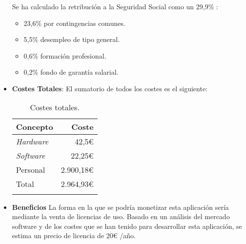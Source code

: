 \begin{itemize}
Se ha calculado la retribución a la Seguridad Social como un 29,9\% : 
\begin{itemize}
	\item 23,6\% por contingencias comunes.
	\item 5,5\% desempleo de tipo general.
	\item 0,6\% formación profesional.
	\item 0,2\% fondo de garantía salarial.
\end{itemize}
\item \textbf{Costes Totales}:
El sumatorio de todos los costes es el siguiente:

\begin{longtable}[]{@{}lr@{}}
\toprule
\begin{minipage}[b]{0.22\columnwidth}\raggedright\strut
\textbf{Concepto}\strut
\end{minipage} & \begin{minipage}[b]{0.22\columnwidth}\raggedright\strut
\textbf{Coste}\strut
\end{minipage}\tabularnewline
\midrule
\endhead
\begin{minipage}[t]{0.22\columnwidth}\raggedright\strut
\emph{Hardware}\strut
\end{minipage} & \begin{minipage}[t]{0.22\columnwidth}\raggedright\strut
42,5\euro{}\strut
\end{minipage}\tabularnewline
\begin{minipage}[t]{0.22\columnwidth}\raggedright\strut
\emph{Software}\strut
\end{minipage} & \begin{minipage}[t]{0.22\columnwidth}\raggedright\strut
22,25\euro{}\strut
\end{minipage}\tabularnewline
\begin{minipage}[t]{0.22\columnwidth}\raggedright\strut
Personal\strut
\end{minipage} & \begin{minipage}[t]{0.22\columnwidth}\raggedright\strut
2.900,18\euro{}\strut
\end{minipage}\tabularnewline
\midrule
\begin{minipage}[t]{0.22\columnwidth}\raggedright\strut
Total\strut
\end{minipage} & \begin{minipage}[t]{0.22\columnwidth}\raggedright\strut
2.964,93\euro{}\strut
\end{minipage}\tabularnewline
\bottomrule
\caption{Costes totales.}
\end{longtable}
\item \textbf{Beneficios}
La forma en la que se podría monetizar esta aplicación sería mediante la venta de licencias de uso. Basado en un análisis del mercado software y de los costes que se han tenido para desarrollar esta aplicación, se estima un precio de licencia de 20\euro{} /año.
\end{itemize}

